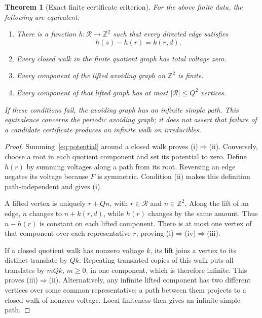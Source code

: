 \documentclass[11pt]{article}
\numberwithin{equation}{section}
\newtheorem{theorem}{Theorem}[section]
\theoremstyle{definition}\newtheorem{definition}[theorem]{Definition}
\theoremstyle{remark}\newtheorem{remark}[theorem]{Remark}
\newcommand{\Z}{\mathbb Z}\newcommand{\Q}{\mathbb Q}\newcommand{\R}{\mathbb R}
\newcommand{\abs}[1]{\lvert #1\rvert}
\begin{document}
\begin{theorem}[Exact finite certificate criterion]\label{thm:certificate}
For the above finite data, the following are equivalent:
\begin{enumerate}[label=\textup{(\roman*)},leftmargin=2.5em]
\item There is a function $h:\mathcal R\to\Z^2$ such that every directed edge satisfies
\begin{equation}\label{eq:potential}
 h(s)-h(r)=k(r,d).
\end{equation}
\item Every closed walk in the finite quotient graph has total voltage zero.
\item Every component of the lifted avoiding graph on $\Z^2$ is finite.
\item Every component of that lifted graph has at most $\abs{\mathcal R}\le Q^2$ vertices.
\end{enumerate}
If these conditions fail, the avoiding graph has an infinite simple path. This equivalence concerns the periodic \emph{avoiding graph}; it does not assert that failure of a candidate certificate produces an infinite walk on irreducibles.
\end{theorem}
\begin{proof}
Summing~\eqref{eq:potential} around a closed walk proves (i)$\Rightarrow$(ii). Conversely, choose a root in each quotient component and set its potential to zero. Define $h(r)$ by summing voltages along a path from its root. Reversing an edge negates its voltage because $F$ is symmetric. Condition (ii) makes this definition path-independent and gives (i).

A lifted vertex is uniquely $r+Qn$, with $r\in\mathcal R$ and $n\in\Z^2$. Along the lift of an edge, $n$ changes to $n+k(r,d)$, while $h(r)$ changes by the same amount. Thus $n-h(r)$ is constant on each lifted component. There is at most one vertex of that component over each representative $r$, proving (i)$\Rightarrow$(iv)$\Rightarrow$(iii).

If a closed quotient walk has nonzero voltage $k$, its lift joins a vertex to its distinct translate by $Qk$. Repeating translated copies of this walk puts all translates by $mQk$, $m\ge0$, in one component, which is therefore infinite. This proves (iii)$\Rightarrow$(ii). Alternatively, any infinite lifted component has two different vertices over some common representative; a path between them projects to a closed walk of nonzero voltage. Local finiteness then gives an infinite simple path.
\end{proof}
\end{document}
